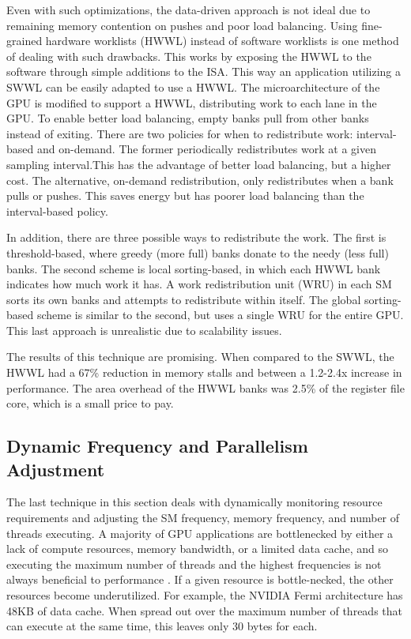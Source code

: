 \documentclass[prodmode,acmtecs]{acmsmall} %
\begin{document}
Even with such optimizations, the data-driven approach is not ideal due to
remaining memory contention on pushes and poor load balancing. Using
fine-grained hardware worklists (HWWL) instead of software worklists is one
method of dealing with such drawbacks. This works by exposing the HWWL to the
software through simple additions to the ISA. This way an application utilizing
a SWWL can be easily adapted to use a HWWL. The microarchitecture of the GPU is
modified to support a HWWL, distributing work to each lane in the GPU. To enable
better load balancing, empty banks pull from other banks instead of exiting.
There are two policies for when to redistribute work: interval-based and
on-demand. The former periodically redistributes work at a given sampling
interval.This has the advantage of better load balancing, but a higher cost. The
alternative, on-demand redistribution, only redistributes when a bank pulls or
pushes. This saves energy but has poorer load balancing than the interval-based
policy.

In addition, there are three possible ways to redistribute the work. The first
is threshold-based, where greedy (more full) banks donate to the needy (less
full) banks. The second scheme is local sorting-based, in which each HWWL bank
indicates how much work it has. A work redistribution unit (WRU) in each SM
sorts its own banks and attempts to redistribute within itself. The global
sorting-based scheme is similar to the second, but uses a single WRU for the
entire GPU. This last approach is unrealistic due to scalability issues.

The results of this technique are promising. When compared to the SWWL, the HWWL
had a 67\% reduction in memory stalls and between a 1.2-2.4x increase in
performance. The area overhead of the HWWL banks was 2.5\% of the register file
core, which is a small price to pay.

\subsection{Dynamic Frequency and Parallelism Adjustment}
The last technique in this section deals with dynamically monitoring resource
requirements and adjusting the SM frequency, memory frequency, and number of
threads executing. A majority of GPU applications are bottlenecked by either a
lack of compute resources, memory bandwidth, or a limited data cache, and so
executing the maximum number of threads and the highest frequencies is not
always beneficial to performance \cite{EqualizerTuningOfResources}. If a given
resource is bottle-necked, the other resources become underutilized. For
example, the NVIDIA Fermi architecture has 48KB of data cache. When spread out
over the maximum number of threads that can execute at the same time, this
leaves only 30 bytes for each.
\end{document}
